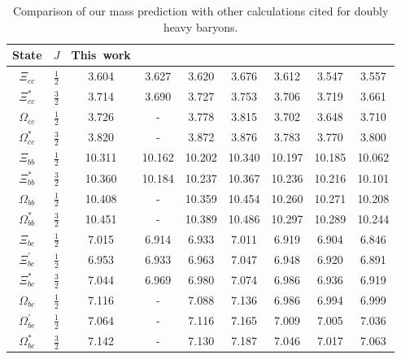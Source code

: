 \documentclass[prd,twocolumn,floatfix,nofootinbib]{revtex4}
\begin{document}
\renewcommand{\tabcolsep}{0.41cm} \renewcommand{\arraystretch}{1.3}
\begin{table}[!hbt]
\caption{Comparison of our mass prediction with other calculations cited for
doubly heavy baryons. }
\label{tab:comparisonB}%
\begin{tabular}{ccccccccc}
\hline\hline
\textrm{State} & $J$ & \textrm{This\ work} & \cite{Ebert:2004ck} & \cite%
{KR:2014gca} & \cite{Roberts:2007ni} & \cite{Albertus:2006ya} & \cite%
{Giannuzzi:2009gh} & \cite{Bernotas:2008fv} \\ \hline
$\Xi_{cc}$ & $\frac{1}{2}$ & 3.604 & 3.627 & 3.620 & 3.676 & 3.612 & 3.547 &
3.557 \\
$\Xi_{cc}^{\ast}$ & $\frac{3}{2}$ & 3.714 & 3.690 & 3.727 & 3.753 & 3.706 &
3.719 & 3.661 \\
$\Omega_{cc}$ & $\frac{1}{2}$ & 3.726 & - & 3.778 & 3.815 & 3.702 & 3.648 &
3.710 \\
$\Omega_{cc}^{\ast}$ & $\frac{3}{2}$ & 3.820 & - & 3.872 & 3.876 & 3.783 &
3.770 & 3.800 \\
$\Xi_{bb}$ & $\frac{1}{2}$ & 10.311 & 10.162 & 10.202 & 10.340 & 10.197 &
10.185 & 10.062 \\
$\Xi_{bb}^{\ast}$ & $\frac{3}{2}$ & 10.360 & 10.184 & 10.237 & 10.367 &
10.236 & 10.216 & 10.101 \\
$\Omega_{bb}$ & $\frac{1}{2}$ & 10.408 & - & 10.359 & 10.454 & 10.260 &
10.271 & 10.208 \\
$\Omega_{bb}^{\ast}$ & $\frac{3}{2}$ & 10.451 & - & 10.389 & 10.486 & 10.297
& 10.289 & 10.244 \\
$\Xi_{bc}$ & $\frac{1}{2}$ & 7.015 & 6.914 & 6.933 & 7.011 & 6.919 & 6.904 &
6.846 \\
$\Xi_{bc}^{\prime}$ & $\frac{1}{2}$ & 6.953 & 6.933 & 6.963 & 7.047 & 6.948
& 6.920 & 6.891 \\
$\Xi_{bc}^{\ast}$ & $\frac{3}{2}$ & 7.044 & 6.969 & 6.980 & 7.074 & 6.986 &
6.936 & 6.919 \\
$\Omega_{bc}$ & $\frac{1}{2}$ & 7.116 & - & 7.088 & 7.136 & 6.986 & 6.994 &
6.999 \\
$\Omega_{bc}^{\prime}$ & $\frac{1}{2}$ & 7.064 & - & 7.116 & 7.165 & 7.009 &
7.005 & 7.036 \\
$\Omega_{bc}^{\ast}$ & $\frac{3}{2}$ & 7.142 & - & 7.130 & 7.187 & 7.046 &
7.017 & 7.063 \\ \hline\hline
\end{tabular}%
\end{table}
\end{document}
